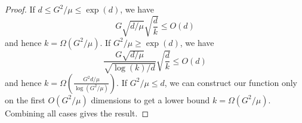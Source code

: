 \begin{proof}
If $d\leq G^{2}/\mu\leq \exp(d)$, we have
\[
G\sqrt{d/\mu}\sqrt{\frac{d}{k}}\leq O(d)
\]
and hence $k=\Omega(G^{2}/\mu)$.
If $G^{2}/\mu\geq\exp(d)$,
we have
\[
\frac{G\sqrt{d/\mu}}{\sqrt{\log(k)/d}}\sqrt{\frac{d}{k}}\leq O(d)
\]
and hence $k=\Omega(\frac{G^{2}d/\mu}{\log(G^{2}/\mu)})$.
If $G^{2}/\mu\leq d$, we can construct our function only on the first
$O(G^{2}/\mu)$ dimensions to get a lower bound $k=\Omega(G^{2}/\mu).$
Combining all cases gives the result.
\end{proof}




